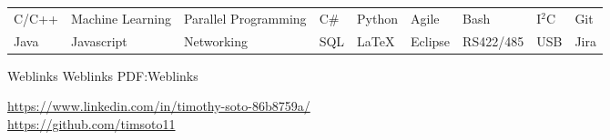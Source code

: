 \documentclass[letterpaper,MMMyyyy,nonstopmode]{simpleresumecv}
\begin{document}
\begin{Body}
    \noindent\begin{tabular}[t]{@{}lllllllll}
        C/C++ & Machine Learning & Parallel Programming & C\# & Python   & Agile   & Bash      & I$^{2}$C & Git  \\
        Java  & Javascript       & Networking           & SQL & {\LaTeX} & Eclipse & RS422/485 & USB      & Jira
    \end{tabular}


    \Section
    {Weblinks}
    {Weblinks}
    {PDF:Weblinks}

    \href{https://www.linkedin.com/in/timothy-soto-86b8759a/}
    {https://www.linkedin.com/in/timothy-soto-86b8759a/} \\
    \href{https://github.com/timsoto11}
    {https://github.com/timsoto11}
\end{Body}
\end{document}
